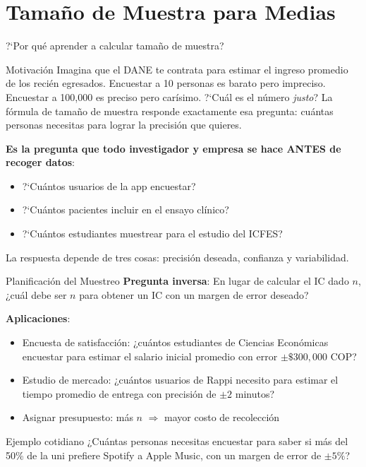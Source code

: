 \documentclass[aspectratio=169, 11pt]{beamer}
\begin{document}
\section{Tamaño de Muestra para Medias}

\begin{frame}{?`Por qu\'e aprender a calcular tama\~no de muestra?}
\begin{exampleblock}{Motivaci\'on}
Imagina que el DANE te contrata para estimar el ingreso promedio de los reci\'en egresados. Encuestar a 10 personas es barato pero impreciso. Encuestar a 100{,}000 es preciso pero carísimo. ?`Cu\'al es el n\'umero \emph{justo}? La f\'ormula de tama\~no de muestra responde exactamente esa pregunta: cu\'antas personas necesitas para lograr la precisi\'on que quieres.
\end{exampleblock}

\textbf{Es la pregunta que todo investigador y empresa se hace ANTES de recoger datos}:
\begin{itemize}\setlength{\itemsep}{1pt}
  \item ?`Cu\'antos usuarios de la app encuestar?
  \item ?`Cu\'antos pacientes incluir en el ensayo cl\'inico?
  \item ?`Cu\'antos estudiantes muestrear para el estudio del ICFES?
\end{itemize}

\alert{La respuesta depende de tres cosas: precisi\'on deseada, confianza y variabilidad.}
\end{frame}

\begin{frame}{Planificación del Muestreo}
\textbf{Pregunta inversa}: En lugar de calcular el IC dado $n$, ¿cuál debe ser $n$ para obtener un IC con un margen de error deseado?

\vspace{0.3cm}
\textbf{Aplicaciones}:
\begin{itemize}
  \item Encuesta de satisfacción: ¿cuántos estudiantes de Ciencias Econ\'omicas encuestar para estimar el salario inicial promedio con error $\pm \$300{,}000$ COP?
  \item Estudio de mercado: ¿cuántos usuarios de Rappi necesito para estimar el tiempo promedio de entrega con precisión de $\pm 2$ minutos?
  \item Asignar presupuesto: más $n$ $\Rightarrow$ mayor costo de recolección
\end{itemize}

\begin{exampleblock}{Ejemplo cotidiano}
¿Cu\'antas personas necesitas encuestar para saber si m\'as del 50\% de la uni prefiere Spotify a Apple Music, con un margen de error de $\pm 5\%$?
\end{exampleblock}
\end{frame}
\end{document}
